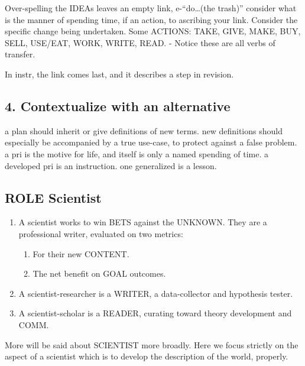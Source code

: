 \documentclass[
]{book}
\providecommand{\tightlist}{%
  \setlength{\itemsep}{0pt}\setlength{\parskip}{0pt}}
\begin{document}
Over-spelling the IDEAs leaves an empty link, e-``do\ldots(the trash)''
consider what is the manner of spending time, if an action, to ascribing your link.
Consider the specific change being undertaken.
Some ACTIONS:
TAKE, GIVE, MAKE, BUY, SELL,
USE/EAT, WORK, WRITE, READ.
- Notice these are all verbs of transfer.

In instr, the link comes last, and it describes a step in revision.

\hypertarget{contextualize-with-an-alternative}{%
\subsection{4. Contextualize with an alternative}\label{contextualize-with-an-alternative}}

a plan should inherit or give definitions of new terms.
new definitions should especially be accompanied by a true use-case,
to protect against a false problem.
a pri is the motive for life, and itself is only a named spending of time.
a developed pri is an instruction.
one generalized is a lesson.

\hypertarget{role-scientist}{%
\subsection{ROLE Scientist}\label{role-scientist}}

\begin{enumerate}
\def\labelenumi{\arabic{enumi}.}
\setcounter{enumi}{46}
\item
  A scientist works to win BETS against the UNKNOWN. They are a
  professional writer, evaluated on two metrics:

  \begin{enumerate}
  \def\labelenumii{\arabic{enumii}.}
  \tightlist
  \item
    For their new CONTENT.
  \item
    The net benefit on GOAL outcomes.
  \end{enumerate}
\item
  A scientist-researcher is a WRITER, a data-collector and hypothesis tester.
\item
  A scientist-scholar is a READER, curating toward theory development and COMM.
\end{enumerate}

More will be said about SCIENTIST more broadly. Here we focus strictly on the aspect of a scientist which is to develop the description of the world, properly.
\end{document}
